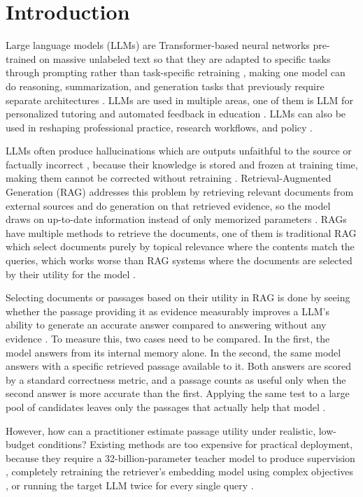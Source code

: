 \documentclass[preprint,12pt,authoryear]{elsarticle}
\begin{document}
\section{Introduction}
Large language models (LLMs) are Transformer-based neural networks pre-trained on massive unlabeled text so that they are adapted to specific tasks through prompting rather than task-specific retraining \citep{min2023}, making one model can do reasoning, summarization, and generation tasks that previously require separate architectures \citep{chang2024}. LLMs are used in multiple areas, one of them is LLM for personalized tutoring and automated feedback in education \citep{kasneci2023}. LLMs can also be used in reshaping professional practice, research workflows, and policy \citep{dwivedi2023}.

LLMs often produce hallucinations which are outputs unfaithful to the source or factually incorrect \citep{ji2023}, because their knowledge is stored and frozen at training time, making them cannot be corrected without retraining \citep{huang2025}. Retrieval-Augmented Generation (RAG) addresses this problem by retrieving relevant documents from external sources and do generation on that retrieved evidence, so the model draws on up-to-date information instead of only memorized parameters \citep{fan2024}. RAGs have multiple methods to retrieve the documents, one of them is traditional RAG which select documents purely by topical relevance where the contents match the queries, which works worse than RAG systems where the documents are selected by their utility for the model \citep{zhang2026}.

Selecting documents or passages based on their utility in RAG is done by seeing whether the passage providing it as evidence measurably improves a LLM's ability to generate an accurate answer compared to answering without any evidence \citep{zhang2026}. To measure this, two cases need to be compared. In the first, the model answers from its internal memory alone. In the second, the same model answers with a specific retrieved passage available to it. Both answers are scored by a standard correctness metric, and a passage counts as useful only when the second answer is more accurate than the first. Applying the same test to a large pool of candidates leaves only the passages that actually help that model \citep{zhang2026}.

However, how can a practitioner estimate passage utility under realistic, low-budget conditions? Existing methods are too expensive for practical deployment, because they require a 32-billion-parameter teacher model to produce supervision \citep{zhang2025b}, completely retraining the retriever's embedding model using complex objectives \citep{sandhu2026}, or running the target LLM twice for every single query \citep{zhang2025c}.
\end{document}
